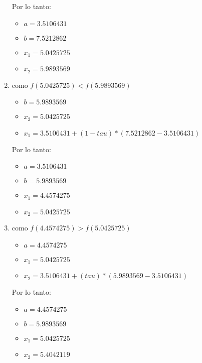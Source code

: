 \documentclass[12pt, fleqn]{article}                            %
\theoremstyle{break}                                            %
\begin{document}
\begin{enumerate}
                Por lo tanto:
                \begin{itemize}
                    \item $a = 3.5106431$
                    \item $b = 7.5212862$
                    \item $x_1 = 5.0425725$
                    \item $x_2 = 5.9893569$
                \end{itemize}

            \clearpage

            \item como $f(5.0425725) < f(5.9893569)$
                \begin{itemize}
                    \item $b = 5.9893569$
                    \item $x_2 = 5.0425725$
                    \item $x_1 = 3.5106431+ (1 -tau) * (7.5212862 - 3.5106431)$
                \end{itemize}

                Por lo tanto:
                \begin{itemize}
                    \item $a = 3.5106431$
                    \item $b = 5.9893569$
                    \item $x_1 = 4.4574275$
                    \item $x_2 = 5.0425725$
                \end{itemize}

            \item como $f(4.4574275) > f(5.0425725)$
            
                \begin{itemize}
                    \item $a = 4.4574275$
                    \item $x_1 = 5.0425725$
                    \item $x_2 = 3.5106431+ (tau) * (5.9893569 - 3.5106431)$
                \end{itemize}

                Por lo tanto:
                \begin{itemize}
                    \item $a = 4.4574275$
                    \item $b = 5.9893569$
                    \item $x_1 = 5.0425725$
                    \item $x_2 = 5.4042119$
                \end{itemize}


            \end{enumerate}
\end{document}
